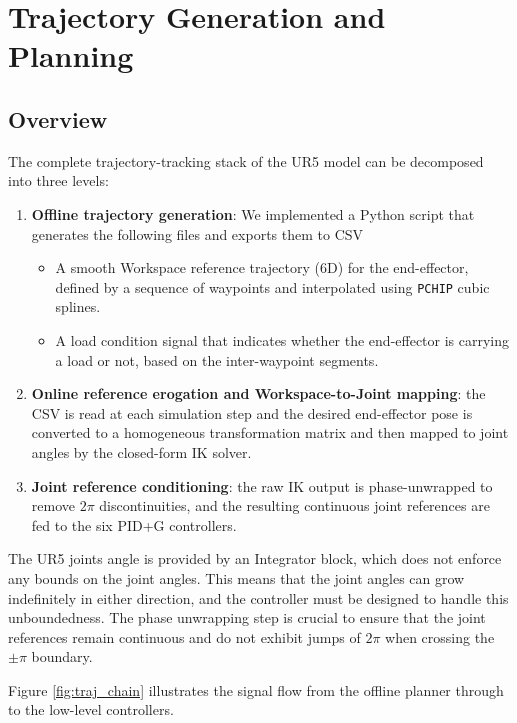 \chapter{Trajectory Generation and Planning}
\label{chap:trajectory}

\section{Overview}

The complete trajectory-tracking stack of the UR5 model can be decomposed into three levels:
\begin{enumerate}
  \item \textbf{Offline trajectory generation}: We implemented a Python script that generates the following files and exports them to CSV
  \begin{itemize}
    \item A smooth Workspace reference trajectory (6D) for the end-effector, defined by a sequence of waypoints and interpolated using \texttt{PCHIP} cubic splines.
    \item A load condition signal that indicates whether the end-effector is carrying a load or not, based on the inter-waypoint segments.
  \end{itemize}
  \item \textbf{Online reference erogation and Workspace-to-Joint mapping}: the CSV is read at each simulation step and the desired end-effector pose is converted to a homogeneous transformation matrix and then mapped to joint angles by the closed-form IK solver.
  \item \textbf{Joint reference conditioning}: the raw IK output is phase-unwrapped to remove $2\pi$ discontinuities, and the resulting continuous joint references are fed to the six PID+G controllers.
\end{enumerate}

The UR5 joints angle is provided by an Integrator block, which does not enforce any bounds on the joint angles. This means that the joint angles can grow indefinitely in either direction, and the controller must be designed to handle this unboundedness. The phase unwrapping step is crucial to ensure that the joint references remain continuous and do not exhibit jumps of $2\pi$ when crossing the $\pm\pi$ boundary.

Figure \ref{fig:traj_chain} illustrates the signal flow from the offline planner through to the low-level controllers.

